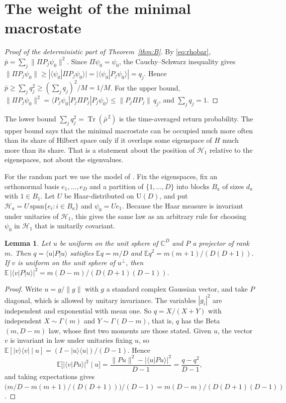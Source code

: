 \documentclass[11pt]{amsart}
\newtheorem{lemma}[theorem]{Lemma}
\theoremstyle{definition}
\newcommand{\CC}{\mathbb{C}}
\newcommand{\EE}{\mathbb{E}}
\newcommand{\Tr}{\operatorname{Tr}}
\newcommand{\rb}{\bar\rho}
\newcommand{\ket}[1]{\lvert #1\rangle}
\newcommand{\bra}[1]{\langle #1\rvert}
\begin{document}
\section{The weight of the minimal macrostate}\label{sec:B}

\begin{proof}[Proof of the deterministic part of Theorem~\ref{thm:B}]
By \eqref{eq:rhobar}, $\bar p=\sum_j\|\Pi P_j\psi_0\|^2$. Since $\Pi\psi_0=\psi_0$, the Cauchy--Schwarz inequality gives $\|\Pi P_j\psi_0\|\ge|\langle\psi_0|\Pi P_j\psi_0\rangle|=|\langle\psi_0|P_j\psi_0\rangle|=q_j$. Hence $\bar p\ge\sum_jq_j^2\ge(\sum_jq_j)^2/M=1/M$. For the upper bound, $\|\Pi P_j\psi_0\|^2=\langle P_j\psi_0|P_j\Pi P_j|P_j\psi_0\rangle\le\|P_j\Pi P_j\|\,q_j$, and $\sum_jq_j=1$.
\end{proof}

The lower bound $\sum_jq_j^2=\Tr(\rb^{\,2})$ is the time-averaged return probability. The upper bound says that the minimal macrostate can be occupied much more often than its share of Hilbert space only if it overlaps some eigenspace of $H$ much more than its share. That is a statement about the position of $\mathcal H_1$ relative to the eigenspaces, not about the eigenvalues.

For the random part we use the model of \cite{CDD26}. Fix the eigenspaces, fix an orthonormal basis $e_1,\dots,e_D$ and a partition of $\{1,\dots,D\}$ into blocks $B_a$ of sizes $d_a$ with $1\in B_1$. Let $U$ be Haar-distributed on $\mathrm U(D)$, and put $\mathcal H_a=U\,\mathrm{span}\{e_i:i\in B_a\}$ and $\psi_0=Ue_1$. Because the Haar measure is invariant under unitaries of $\mathcal H_1$, this gives the same law as an arbitrary rule for choosing $\psi_0$ in $\mathcal H_1$ that is unitarily covariant.

\begin{lemma}\label{lem:beta}
Let $u$ be uniform on the unit sphere of $\CC^D$ and $P$ a projector of rank $m$. Then $q=\langle u|P|u\rangle$ satisfies $\EE q=m/D$ and $\EE q^2=m(m+1)/(D(D+1))$. If $v$ is uniform on the unit sphere of $u^\perp$, then $\EE\,|\langle v|P|u\rangle|^2=m(D-m)/(D(D+1)(D-1))$.
\end{lemma}

\begin{proof}
Write $u=g/\|g\|$ with $g$ a standard complex Gaussian vector, and take $P$ diagonal, which is allowed by unitary invariance. The variables $|g_i|^2$ are independent and exponential with mean one. So $q=X/(X+Y)$ with independent $X\sim\Gamma(m)$ and $Y\sim\Gamma(D-m)$, that is, $q$ has the Beta$(m,D-m)$ law, whose first two moments are those stated. Given $u$, the vector $v$ is invariant in law under unitaries fixing $u$, so $\EE[\ket v\bra v\mid u]=(I-\ket u\bra u)/(D-1)$. Hence
\[
\EE\big[|\langle v|Pu\rangle|^2\mid u\big]=\frac{\|Pu\|^2-|\langle u|Pu\rangle|^2}{D-1}=\frac{q-q^2}{D-1},
\]
and taking expectations gives $\big(m/D-m(m+1)/(D(D+1))\big)/(D-1)=m(D-m)/(D(D+1)(D-1))$.
\end{proof}
\end{document}
